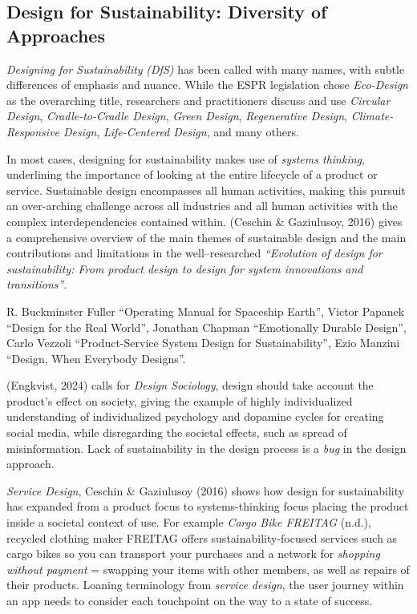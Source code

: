 \documentclass[
  letterpaper,
  DIV=11,
  numbers=noendperiod]{scrartcl}
\begin{document}
\subsection{Design for Sustainability: Diversity of
Approaches}\label{design-for-sustainability-diversity-of-approaches}

\emph{Designing for Sustainability} \emph{(DfS)} has been called with
many names, with subtle differences of emphasis and nuance. While the
ESPR legislation chose \emph{Eco-Design} as the overarching title,
researchers and practitioners discuss and use \emph{Circular Design},
\emph{Cradle-to-Cradle Design}, \emph{Green Design}, \emph{Regenerative
Design}, \emph{Climate-Responsive Design}, \emph{Life-Centered Design},
and many others.

In most cases, designing for sustainability makes use of \emph{systems
thinking}, underlining the importance of looking at the entire lifecycle
of a product or service. Sustainable design encompasses all human
activities, making this pursuit an over-arching challenge across all
industries and all human activities with the complex interdependencies
contained within. (Ceschin \& Gaziulusoy, 2016) gives a comprehensive
overview of the main themes of sustainable design and the main
contributions and limitations in the well--researched \emph{``Evolution
of design for sustainability: From product design to design for system
innovations and transitions''}.

R. Buckminster Fuller ``Operating Manual for Spaceship Earth'', Victor
Papanek ``Design for the Real World'', Jonathan Chapman ``Emotionally
Durable Design'', Carlo Vezzoli ``Product-Service System Design for
Sustainability'', Ezio Manzini ``Design, When Everybody Designs''.

(Engkvist, 2024) calls for \emph{Design Sociology}, design should take
account the product's effect on society, giving the example of highly
individualized understanding of individualized psychology and dopamine
cycles for creating social media, while disregarding the societal
effects, such as spread of misinformation. Lack of sustainability in the
design process is a \emph{bug} in the design approach.

\emph{Service Design}, Ceschin \& Gaziulusoy (2016) shows how design for
sustainability has expanded from a product focus to systems-thinking
focus placing the product inside a societal context of use. For example
\emph{Cargo Bike {\textbar} {FREITAG}} (n.d.), recycled clothing maker
FREITAG offers sustainability-focused services such as cargo bikes so
you can transport your purchases and a network for \emph{shopping
without payment} = swapping your items with other members, as well as
repairs of their products. Loaning terminology from \emph{service
design}, the user journey within an app needs to consider each
touchpoint on the way to a state of success.
\end{document}
